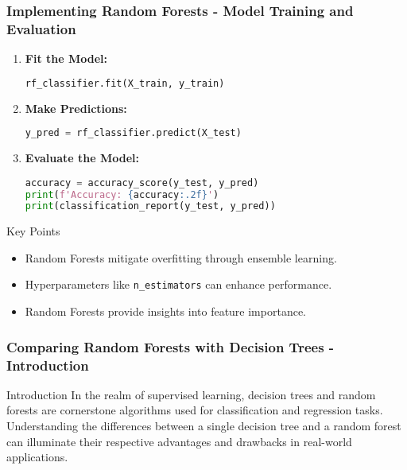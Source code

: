 \documentclass[aspectratio=169]{beamer}
\begin{document}
\begin{frame}[fragile]
    \frametitle{Implementing Random Forests - Model Training and Evaluation}
    \begin{enumerate}[resume]
        \item \textbf{Fit the Model:}
        \begin{lstlisting}[language=Python]
rf_classifier.fit(X_train, y_train)
        \end{lstlisting}
        
        \item \textbf{Make Predictions:}
        \begin{lstlisting}[language=Python]
y_pred = rf_classifier.predict(X_test)
        \end{lstlisting}
        
        \item \textbf{Evaluate the Model:}
        \begin{lstlisting}[language=Python]
accuracy = accuracy_score(y_test, y_pred)
print(f'Accuracy: {accuracy:.2f}')
print(classification_report(y_test, y_pred))
        \end{lstlisting}
    \end{enumerate}
    \begin{block}{Key Points}
        \begin{itemize}
            \item Random Forests mitigate overfitting through ensemble learning.
            \item Hyperparameters like \texttt{n\_estimators} can enhance performance.
            \item Random Forests provide insights into feature importance.
        \end{itemize}
    \end{block}
\end{frame}

\begin{frame}[fragile]
    \frametitle{Comparing Random Forests with Decision Trees - Introduction}
    \begin{block}{Introduction}
        In the realm of supervised learning, decision trees and random forests are cornerstone algorithms used for classification and regression tasks. Understanding the differences between a single decision tree and a random forest can illuminate their respective advantages and drawbacks in real-world applications.
    \end{block}
\end{frame}
\end{document}
